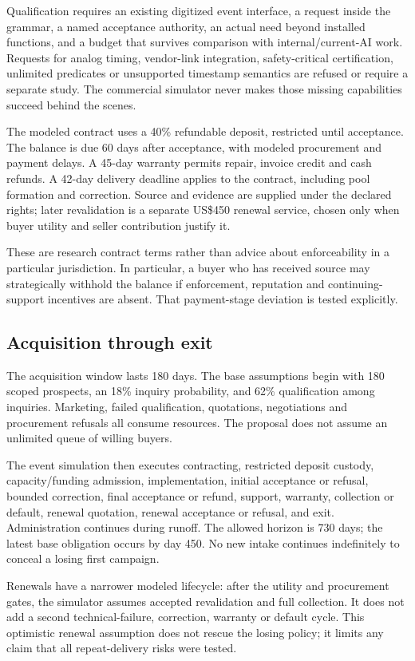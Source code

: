 Qualification requires an existing digitized event interface, a request inside the grammar, a named acceptance authority, an actual need beyond installed functions, and a budget that survives comparison with internal/current-AI work. Requests for analog timing, vendor-link integration, safety-critical certification, unlimited predicates or unsupported timestamp semantics are refused or require a separate study. The commercial simulator never makes those missing capabilities succeed behind the scenes.

The modeled contract uses a 40\% refundable deposit, restricted until acceptance. The balance is due 60 days after acceptance, with modeled procurement and payment delays. A 45-day warranty permits repair, invoice credit and cash refunds. A 42-day delivery deadline applies to the contract, including pool formation and correction. Source and evidence are supplied under the declared rights; later revalidation is a separate US\$450 renewal service, chosen only when buyer utility and seller contribution justify it.

These are research contract terms rather than advice about enforceability in a particular jurisdiction. In particular, a buyer who has received source may strategically withhold the balance if enforcement, reputation and continuing-support incentives are absent. That payment-stage deviation is tested explicitly.

\subsection{Acquisition through exit}
The acquisition window lasts 180 days. The base assumptions begin with 180 scoped prospects, an 18\% inquiry probability, and 62\% qualification among inquiries. Marketing, failed qualification, quotations, negotiations and procurement refusals all consume resources. The proposal does not assume an unlimited queue of willing buyers.

The event simulation then executes contracting, restricted deposit custody, capacity/funding admission, implementation, initial acceptance or refusal, bounded correction, final acceptance or refund, support, warranty, collection or default, renewal quotation, renewal acceptance or refusal, and exit. Administration continues during runoff. The allowed horizon is 730 days; the latest base obligation occurs by day 450. No new intake continues indefinitely to conceal a losing first campaign.

Renewals have a narrower modeled lifecycle: after the utility and procurement gates, the simulator assumes accepted revalidation and full collection. It does not add a second technical-failure, correction, warranty or default cycle. This optimistic renewal assumption does not rescue the losing policy; it limits any claim that all repeat-delivery risks were tested.

